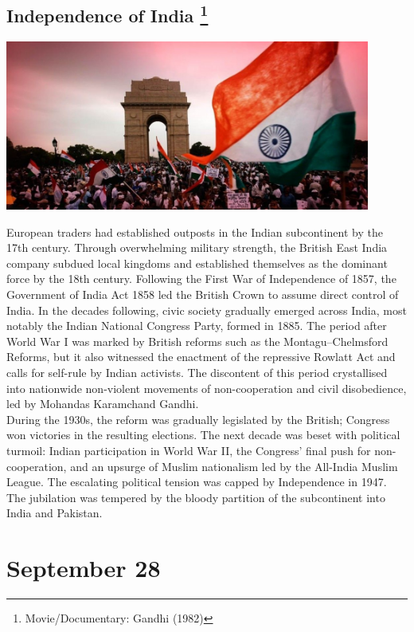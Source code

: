 \documentclass[11pt]{report}
\begin{document}
\subsection{Independence of India \protect\footnote{Movie/Documentary: Gandhi (1982)}}
\vspace{2mm}\begin{center}\includegraphics[width=12cm]{./img/independenceIndia.jpg}\end{center}
European traders had established outposts in the Indian subcontinent by the 17th century. Through overwhelming military strength, the British East India company subdued local kingdoms and established themselves as the dominant force by the 18th century. Following the First War of Independence of 1857, the Government of India Act 1858 led the British Crown to assume direct control of India. In the decades following, civic society gradually emerged across India, most notably the Indian National Congress Party, formed in 1885. The period after World War I was marked by British reforms such as the Montagu–Chelmsford Reforms, but it also witnessed the enactment of the repressive Rowlatt Act and calls for self-rule by Indian activists. The discontent of this period crystallised into nationwide non-violent movements of non-cooperation and civil disobedience, led by Mohandas Karamchand Gandhi.\\
\indent During the 1930s, the reform was gradually legislated by the British; Congress won victories in the resulting elections. The next decade was beset with political turmoil: Indian participation in World War II, the Congress' final push for non-cooperation, and an upsurge of Muslim nationalism led by the All-India Muslim League. The escalating political tension was capped by Independence in 1947. The jubilation was tempered by the bloody partition of the subcontinent into India and Pakistan.
\section{September 28}
\end{document}
